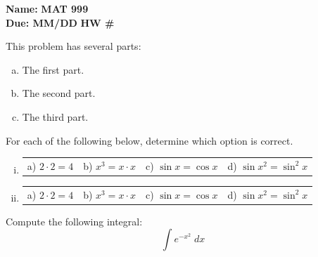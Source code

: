 \documentclass[11pt,letterpaper]{article}
\newcommand{\homework}[2]{\noindent\textbf{Name: }\makebox[3in]{\hrulefill} \hfill \textbf{MAT 999} \\  \textbf{Due: #2} \hfill \textbf{HW #1}\\}
\newcounter{problem}
\begin{document}
\homework{\#}{MM/DD}


\begin{exercise}
This problem has several parts:
	\begin{enumerate}[(a)]
	\item The first part.
	\item The second part. 
	\item The third part. 
	\end{enumerate}
\end{exercise}



\begin{exercise}
For each of the following below, determine which option is correct.
\begin{enumerate}[(i)]
\item 
        \begin{tabular}{p{3cm}p{3cm}p{3cm}p{3cm}}
        a) $2 \cdot 2= 4$ & b) $x^3= x \cdot x$ & c) $\sin x = \cos x$ & d) $\sin x^2= \sin^2 x$
        \end{tabular} 
        \item
        \begin{tabular}{p{3cm}p{3cm}p{3cm}p{3cm}}
        a) $2 \cdot 2= 4$ & b) $x^3= x \cdot x$ & c) $\sin x = \cos x$ & d) $\sin x^2= \sin^2 x$
        \end{tabular} 
\end{enumerate}
\end{exercise}



\begin{exercise}
Compute the following integral:
	\[
	\int e^{-x^2} \;dx
	\] \vspace{6cm}
\end{exercise}
\end{document}

